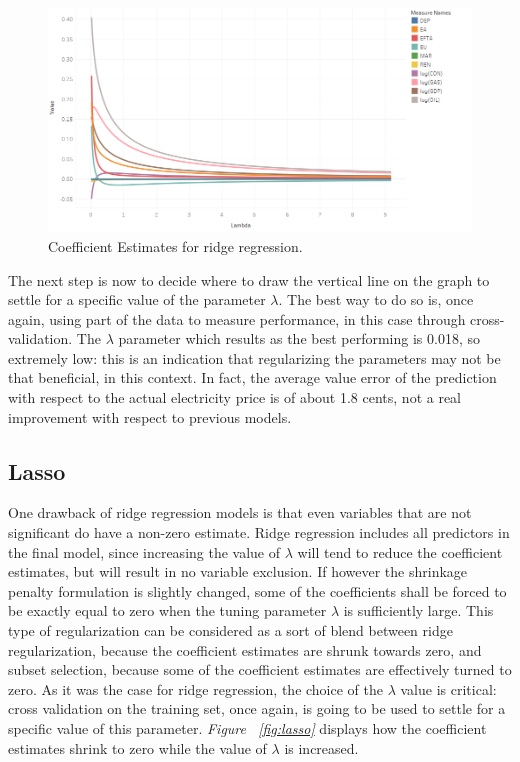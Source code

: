 \documentclass[a4paper,12pt]{book}
\begin{document}
\begin{figure}[tb]
\begin{center}
\captionsetup{justification=centering}
\includegraphics[width=1\textwidth]{Images/ridge.png}
\caption{Coefficient Estimates for ridge regression.}
\label{fig:ridge}
\end{center}
\end{figure}

The next step is now to decide where to draw the vertical line on the graph to settle for a specific value of the parameter $\lambda$. The best way to do so is, once again, using part of the data to measure performance, in this case through cross-validation. The $\lambda$ parameter which results as the best performing is 0.018, so extremely low: this is an indication that regularizing the parameters may not be that beneficial, in this context. In fact, the average value error of the prediction with respect to the actual electricity price is of about 1.8 cents, not a real improvement with respect to previous models.

\subsection{Lasso}

One drawback of ridge regression models is that even variables that are not significant do have a non-zero estimate. Ridge regression includes all predictors in the final model, since increasing the value of $\lambda$ will tend to reduce the coefficient estimates, but will result in no variable exclusion. If however the shrinkage penalty formulation is slightly changed, some of the coefficients shall be forced to be exactly equal to zero when the tuning parameter $\lambda$ is sufficiently large. This type of regularization can be considered as a sort of blend between ridge regularization, because the coefficient estimates are shrunk towards zero, and subset selection, because some of the coefficient estimates are effectively turned to zero. As it was the case for ridge regression, the choice of the $\lambda$ value is critical: cross validation on the training set, once again, is going to be used to settle for a specific value of this parameter. \textit{Figure ~\ref{fig:lasso}} displays how the coefficient estimates shrink to zero while the value of $\lambda$ is increased.
\end{document}
